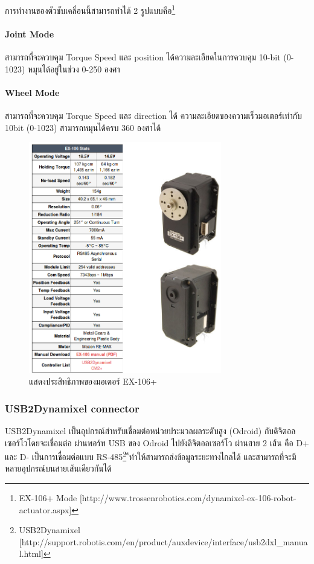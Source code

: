 การทำงานของตัวขับเคลื่อนนี้สามารถทำได้ 2 รูปแบบคือ\footnote{ EX-106+ Mode [http://www.trossenrobotics.com/dynamixel-ex-106-robot-actuator.aspx] }

\paragraph*{Joint Mode}
สามารถที่จะควบคุม Torque Speed และ position ได้ความละเอียดในการควบคุม 10-bit (0-1023) หมุนได้อยู่ในช่วง 0-250 องศา

\paragraph*{Wheel Mode}
สามารถที่จะควบคุม Torque Speed และ direction ได้ ความละเอียดของความเร็วมอเตอร์เท่ากับ 10bit (0-1023) สามารถหมุนได้ครบ 360 องศาได้

\begin{figure}[!ht]
    \centering
    \includegraphics[width=0.75\textwidth]{chapter3/images/dxl_ex106.png}
    \caption{แสดงประสิทธิภาพของมอเตอร์ EX-106+}
    \label{fig:dxl_ex106}
\end{figure}


\clearpage
\subsubsection*{USB2Dynamixel connector}
USB2Dynamixel เป็นอุปกรณ์สำหรับเชื่อมต่อหน่วยประมวลผลระดับสูง (Odroid) กับดิจิตอลเซอร์โวโดยจะเชื่อมต่อ ผ่านพอร์ท USB ของ Odroid ไปยังดิจิตอลเซอร์โว
ผ่านสาย 2 เส้น คือ D+ และ D-
เป็นการเชื่อมต่อแบบ RS-485\footnote{USB2Dynamixel [http://support.robotis.com/en/product/auxdevice/interface/usb2dxl\_manual.html]}
ืทำให้สามารถส่งข้อมูลระยะทางไกลได้ และสามารถที่จะมีหลายอุปกรณ์บนสายเส้นเดียวกันได้


